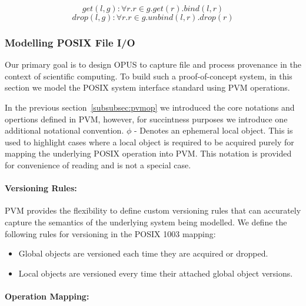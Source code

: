 \documentclass[withindex,glossary]{cam-thesis}
\begin{document}
$$get(l, g):\forall r.r \in g.get(r).bind(l,r)$$
$$drop(l, g):\forall r.r \in g.unbind(l, r).drop(r)$$


\subsubsection{Modelling POSIX File I/O}
Our primary goal is to design OPUS to capture file and process provenance in the context of scientific computing.
To build such a proof-of-concept system, in this section we model the POSIX system interface standard using PVM operations.

In the previous section~\ref{subsubsec:pvmop} we introduced the core notations and opertions defined in PVM, however, for succintness purposes we introduce one additional notational convention.
$\phi$ - Denotes an ephemeral local object. This is used to highlight cases where a local object is required to be acquired purely for mapping the underlying POSIX operation into PVM.
This notation is provided for convenience of reading and is not a special case.

\paragraph{Versioning Rules:}
PVM provides the flexibility to define custom versioning rules that can accurately capture the semantics of the underlying system being modelled.
We define the following rules for versioning in the POSIX 1003 mapping:

\begin{itemize}
\item Global objects are versioned each time they are acquired or dropped.
\item Local objects are versioned every time their attached global object versions.
\end{itemize}

\paragraph{Operation Mapping:}
\end{document}
